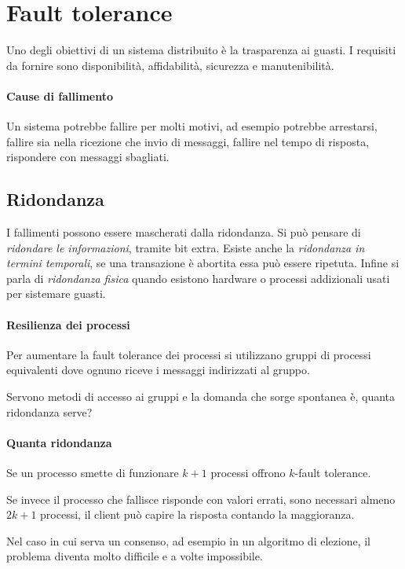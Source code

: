 \section{Fault tolerance}
Uno degli obiettivi di un sistema distribuito è
la trasparenza ai guasti. I requisiti da fornire sono 
disponibilità, affidabilità, sicurezza e manutenibilità.

\paragraph{Cause di fallimento}
Un sistema potrebbe fallire per molti motivi, ad esempio
potrebbe arrestarsi, fallire sia nella ricezione che invio 
di messaggi, fallire nel tempo di risposta, rispondere 
con messaggi sbagliati.

\subsection{Ridondanza}
I fallimenti possono essere mascherati dalla ridondanza.
Si può pensare di \emph{ridondare le informazioni}, 
tramite bit extra. Esiste anche la \emph{ridondanza in termini 
temporali}, se una transazione è abortita essa può essere 
ripetuta. Infine si parla di \emph{ridondanza fisica} quando 
esistono hardware o processi addizionali usati per sistemare
guasti.

\paragraph{Resilienza dei processi}
Per aumentare la fault tolerance dei processi 
si utilizzano gruppi di processi 
equivalenti dove ognuno riceve i messaggi indirizzati al gruppo.

Servono metodi di accesso ai gruppi e la domanda che 
sorge spontanea è, quanta ridondanza serve?

\paragraph{Quanta ridondanza}
Se un processo smette di funzionare $k + 1$ processi 
offrono $k$-fault tolerance.

Se invece il processo che fallisce risponde con valori 
errati, sono necessari almeno $2k +1$ processi, il client può 
capire la risposta contando la maggioranza.

Nel caso in cui serva un consenso, ad esempio in un algoritmo 
di elezione, il problema diventa molto difficile e a volte 
impossibile.


